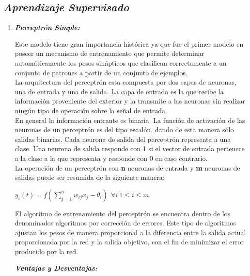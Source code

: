\documentclass[journal]{IEEEtran}
\begin{document}
\subsection{\textbf{\emph{Aprendizaje Supervisado}}}

\begin{enumerate}
\item \textbf{\emph{Perceptrón Simple:}}
        
Este modelo tiene gran importancia histórica ya que fue el primer modelo en poseer un mecanismo de entrenamiento que permite determinar automáticamente los pesos sinápticos que clasifican correctamente a un conjunto de patrones a partir de un conjunto de ejemplos.\\  
    
La arquitectura del perceptrón esta compuesta por dos capas de neuronas, una de entrada y una de salida. La capa de entrada es la que recibe la información proveniente del exterior y la transmite a las neuronas sin realizar ningún tipo de operación sobre la señal de entrada.\\

En general la información entrante es binaria. La función de activación de las neuronas de un perceptrón es del tipo escalón, dando de esta manera sólo salidas binarias. Cada neurona de salida del perceptrón representa a una clase. Una neurona de salida responde con 1 si el vector de entrada pertenece a la clase a la que representa y responde con 0 en caso contrario.\\

La operación de un perceptrón con \textbf{n} neuronas de entrada y \textbf{m} neuronas de salidas puede ser resumida de la siguiente manera:
    
\begin{center}
$y_i(t) =f(\sum_{j=1}^{n}w_{ij}x_j -\theta_{i})\ \ \forall i \ 1\leq i \leq m.$
\end{center}
    
El algoritmo de entrenamiento del perceptrón se encuentra dentro de los denominados algoritmos por corrección de errores. Este tipo de algoritmos ajustan los pesos de manera proporcional a la diferencia entre la salida actual proporcionada por la red y la salida objetivo, con el fin de minimizar el error producido por la red.\\
    
\begin{center}
\textbf{\emph{Ventajas y Desventajas:}}
\end{center}
	   

\end{enumerate}
\end{document}
